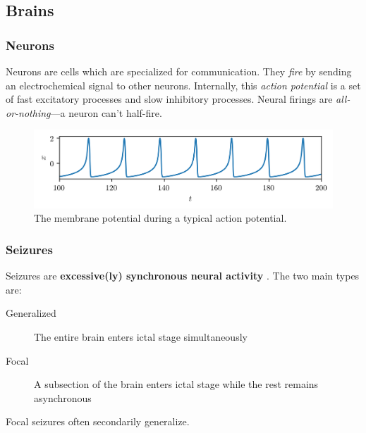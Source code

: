\documentclass[hyperref={hidelinks}]{beamer}
\begin{document}
\subsection{Brains}
\begin{frame}
  \frametitle{Neurons}
  Neurons are cells which are specialized for communication.
  They \textit{fire} by sending an electrochemical signal to other neurons.
  Internally, this \textit{action potential} is a set of fast excitatory processes and slow inhibitory processes.
  Neural firings are \textit{all-or-nothing}---a neuron can't half-fire.

  \vfill

  \begin{figure}[ht]
    \centering
    \includegraphics[width=\textwidth]{figure/action_potential}
    \caption{The membrane potential during a typical action potential.}
    \label{fig:action_potential}
  \end{figure}

\end{frame}

\begin{frame}
  \frametitle{Seizures}
  Seizures are \textbf{excessive(ly) synchronous neural activity} \cite{Kandel2013}.
  The two main types are:
  \begin{description}
  \item[Generalized] The entire brain enters ictal stage simultaneously

  \item[Focal] A subsection of the brain enters ictal stage while the rest remains asynchronous

  \end{description}

  Focal seizures often secondarily generalize.

\end{frame}
\end{document}
